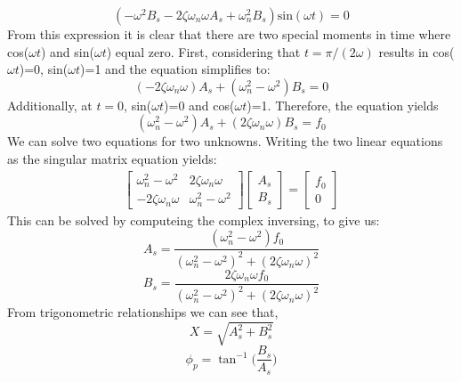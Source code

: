 \documentclass[12pt,letter]{article}
\numberwithin{ex}{section} %
\numberwithin{re}{section} %
\numberwithin{vcs}{section} %
\begin{document}
			\begin{equation*}
				(-\omega^2 B_s - 2 \zeta \omega_n \omega A_s + \omega_n^2 B_s)\text{sin}(\omega t) =0
			\end{equation*}	
			From this expression it is clear that there are two special moments in time where cos($\omega t$) and sin($\omega t$) equal zero. First, considering that $t=\pi/(2\omega)$ results in cos($\omega t$)=0, sin($\omega t$)=1 and the equation simplifies to:
			\begin{equation}
				(-2\zeta \omega_n \omega)A_s + (\omega_n^2 - \omega^2)B_s = 0
			\end{equation}	
			Additionally, at $t=0$, sin($\omega t$)=0 and cos($\omega t$)=1. Therefore, the equation yields		
			\begin{equation}
				(\omega_n^2 - \omega^2)A_s + (2\zeta \omega_n \omega)B_s = f_0
			\end{equation}				
			We can solve two equations for two unknowns. Writing the two linear equations as the singular matrix equation yields:
			\begin{gather}
			   \begin{bmatrix}
			   \omega_n^2 - \omega^2 & 2\zeta \omega_n \omega \\
			   - 2\zeta \omega_n \omega &  \omega_n^2 - \omega^2
			   \end{bmatrix}
  			   \begin{bmatrix}
  			   A_s \\
  			   B_s
  			   \end{bmatrix}
			 = \begin{bmatrix} f_0 \\ 0
			 \end{bmatrix}
			\end{gather}
			This can be solved by computeing the complex inversing, to give us:
			\begin{equation}
				A_s = \frac{(\omega_n^2 - \omega^2)f_0}{(\omega_n^2 - \omega^2)^2 +  (2\zeta \omega_n \omega)^2}
			\end{equation}	
			\begin{equation}
				B_s = \frac{2\zeta \omega_n \omega f_0}{(\omega_n^2 - \omega^2)^2 +  (2\zeta \omega_n \omega)^2}
			\end{equation}	
			From trigonometric relationships we can see that, 
			\begin{equation}
				X = \sqrt{A_s^2 + B_s^2}
			\end{equation}	
			\begin{equation}
				\phi_p = \tan^{-1}\bigg(\frac{B_s}{A_s}\bigg)
			\end{equation}	
\end{document}
